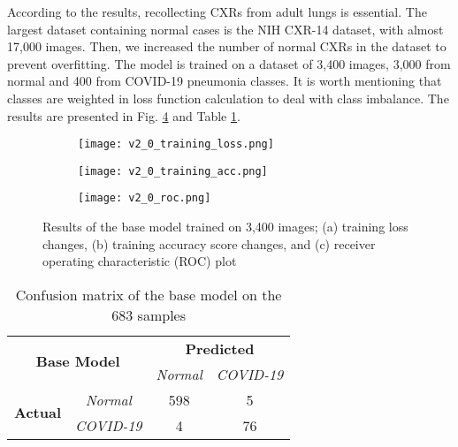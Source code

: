 \documentclass{article}
\begin{document}
According to the results, recollecting CXRs from adult lungs is essential. The largest dataset containing normal cases is the NIH CXR-14 dataset, with almost 17,000 images. Then, we increased the number of normal CXRs in the dataset to prevent overfitting. The model is trained on a dataset of 3,400 images, 3,000 from normal and 400 from COVID-19 pneumonia classes. It is worth mentioning that classes are weighted in loss function calculation to deal with class imbalance. The results are presented in Fig. \ref{fig:v2.0_training} and Table \ref{base_model_table_683}.

\begin{figure}[H]
    \begin{subfigure}{0.30\linewidth}
        \centering
        \texttt{[image: v2\_0\_training\_loss.png]}
        \caption{}
        \label{fig:v2.0_loss}
    \end{subfigure}
    \hfill
    \begin{subfigure}{0.30\linewidth}
        \centering
        \texttt{[image: v2\_0\_training\_acc.png]}
        \caption{}
        \label{fig:v2.0_acc}
    \end{subfigure}
    \hfill
    \begin{subfigure}{0.30\linewidth}
        \centering
        \texttt{[image: v2\_0\_roc.png]}
        \caption{}
        \label{fig:v2.0_roc}
    \end{subfigure}
\caption{Results of the base model trained on 3,400 images; (a) training loss changes, (b) training accuracy score changes, and (c) receiver operating characteristic (ROC) plot}
\label{fig:v2.0_training}
\end{figure}

\begin{table}[H]
\caption{Confusion matrix of the base model on the 683 samples}
\label{base_model_table_683}
\centering
\begin{tabular}{|c|c|c|c|}
\hline
\multicolumn{2}{|c|}{\multirow{2}{*}{\textbf{Base Model}}} & \multicolumn{2}{c|}{\textbf{Predicted}} \\ \cline{3-4} 
\multicolumn{2}{|c|}{}                                     & \textit{Normal}   & \textit{COVID-19}   \\ \hline
\multirow{2}{*}{\textbf{Actual}}    & \textit{Normal}      & 598                & 5                   \\ \cline{2-4} 
                                    & \textit{COVID-19}    & 4                 & 76                  \\ \hline
\end{tabular}
\end{table}
\end{document}
